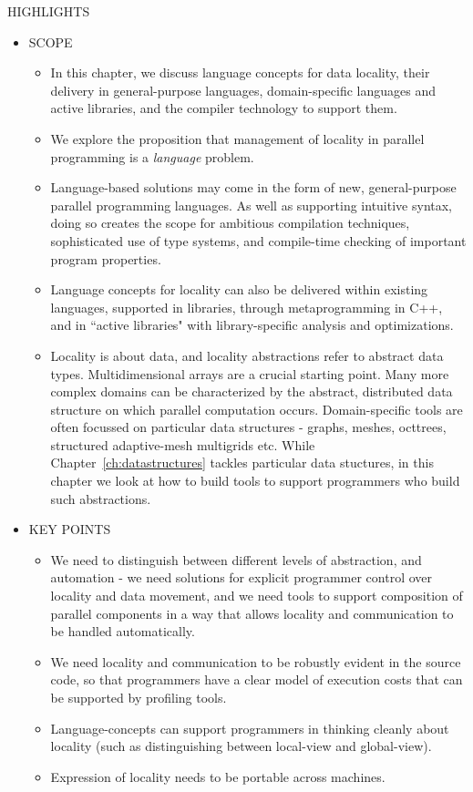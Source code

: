 HIGHLIGHTS
\begin{itemize}
\item SCOPE
  \begin{itemize}
  \item In this chapter, we discuss language concepts for data locality, their delivery in general-purpose languages, domain-specific languages and active libraries, and the compiler technology to support them.
  \item We explore the proposition that management of locality in parallel programming is a \emph{language} problem.
  \item Language-based solutions may come in the form of new, general-purpose parallel programming languages.  As well as supporting intuitive syntax, doing so creates the scope for ambitious compilation techniques, sophisticated use of type systems, and compile-time checking of important program properties.  
  \item Language concepts for locality can also be delivered within existing languages, supported in libraries, through metaprogramming in C++, and in ``active libraries" with library-specific analysis and optimizations.
  \item Locality is about data, and locality abstractions refer to abstract data types.  Multidimensional arrays are a crucial starting point.  Many more complex domains can be characterized by the abstract, distributed data structure on which parallel computation occurs.  Domain-specific tools are often focussed on particular data structures - graphs, meshes, octtrees, structured adaptive-mesh multigrids etc.  While Chapter~\ref{ch:datastructures} tackles particular data stuctures, in this chapter we look at how to build tools to support programmers who build such abstractions.
  \end{itemize}

\item KEY POINTS
  \begin{itemize}
  \item We need to distinguish between different levels of abstraction, and automation - we need solutions for explicit programmer control over locality and data movement, and we need tools to support composition of parallel components in a way that allows locality and communication to be handled automatically.
  \item We need locality and communication to be robustly evident in the source code, so that programmers have a clear model of execution costs that can be supported by profiling tools.
  \item Language-concepts can support programmers in thinking cleanly about locality (such as distinguishing between local-view and global-view).
  \item Expression of locality needs to be portable across machines.
  \end{itemize}


\end{itemize}
